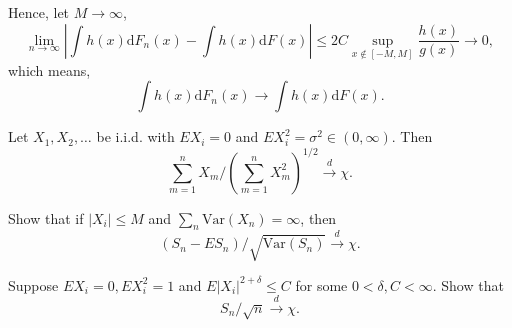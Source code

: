 \begin{solution}
    Hence, let $M\rightarrow\infty$,
    \begin{equation*}
        \lim_{n\rightarrow\infty}\left|\int h(x)\mathrm{d}F_{n}(x)-\int h(x)\mathrm{d}F(x)\right| \leq 2C\sup_{x\notin[-M,M]}\frac{h(x)}{g(x)}\rightarrow 0,
    \end{equation*}
    which means,
    \begin{equation*}
        \int h(x)\mathrm{d}F_{n}(x) \rightarrow \int h(x)\mathrm{d}F(x).
    \end{equation*}
\end{solution}

\begin{exercise}
    Let $X_{1},X_{2},\ldots$ be i.i.d. with $EX_{i}=0$ and $EX_{i}^{2}=\sigma^{2}\in(0,\infty)$. Then
    \begin{equation*}
        \sum_{m=1}^{n}X_{m}/\left(\sum_{m=1}^{n}X_{m}^{2}\right)^{1/2}\stackrel{d}{\rightarrow}\chi.
    \end{equation*}
\end{exercise}

\begin{exercise}
    Show that if $\left|X_{i}\right|\leq M$ and $\sum_{n}\text{Var}\left(X_{n}\right)=\infty$, then
    \begin{equation*}
        \left(S_{n}-E S_{n}\right)/\sqrt{\text{Var}\left(S_{n}\right)}\stackrel{d}{\rightarrow}\chi.
    \end{equation*}
\end{exercise}

\begin{exercise}
    Suppose $EX_{i}=0,EX_{i}^{2}=1$ and $E\left|X_{i}\right|^{2+\delta}\leq C$ for some $0<\delta,C<\infty$. Show that
    \begin{equation*}
        S_{n}/\sqrt{n}\stackrel{d}{\rightarrow}\chi.
    \end{equation*}
\end{exercise}